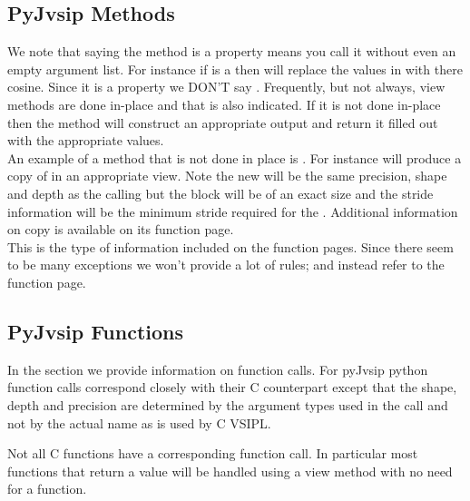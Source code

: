 \subsection*{PyJvsip Methods}
We note that saying the method is a property means you call it without even an empty argument list. For instance if  is a \pyjv{}  then  will replace the values in  with there cosine. Since it is a property we DON'T say . Frequently, but not always, view methods are done in-place and that is also indicated. If it is not done in-place then the method will construct an appropriate output  and return it filled out with the appropriate values.\\
%
An example of a  method that is not done in place is . For instance  will produce a copy of  in an appropriate view. Note the new  will be the same precision, shape and depth as the calling  but the \ttbf block will be of an exact size and the stride information will be the minimum stride required for the . Additional information on copy is available on its function page.\\
%
This is the type of information included on the function pages. Since there seem to be many exceptions we won't provide a lot of rules; and instead refer to the function page.\\
%
\subsection*{PyJvsip Functions}
In the \pyjv{}  section we provide information on function calls. For pyJvsip python function calls correspond closely with their C counterpart except that the shape, depth and precision are determined by the argument types used in the call and not by the actual name as is used by C VSIPL.

Not all C functions have a corresponding \pyjv{} function call. In particular most functions that return a value will be handled using a view method with no need for a function.
 
